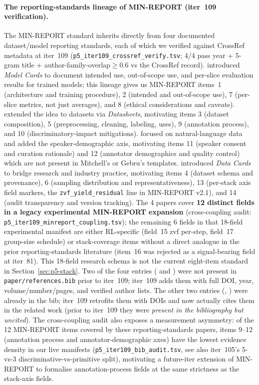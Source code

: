 \documentclass{article}  \usepackage[preprint,nonatbib]{neurips_2026} \usepackage[numbers]{natbib}
\providecommand{\secref}[1]{Section~\ref{#1}}
\begin{document}
\paragraph{The reporting-standards lineage of MIN-REPORT (iter~109
verification).} The MIN-REPORT standard inherits directly from four
documented dataset/model reporting standards, each of which we verified
against CrossRef metadata at iter~109 (\texttt{p5\_iter109\_crossref\_verify.tsv};
4/4 pass year + 5-gram title + author-family-overlap$\geq 0.6$ vs the
CrossRef record). \citet{mitchell2019modelcards} introduced \emph{Model
Cards} to document intended use, out-of-scope use, and per-slice evaluation
results for trained models; this lineage gives us MIN-REPORT items~1
(architecture and training procedure), 2 (intended and out-of-scope use),
7 (per-slice metrics, not just averages), and 8 (ethical considerations and
caveats). \citet{gebru2021datasheets} extended the idea to datasets via
\emph{Datasheets}, motivating items 3 (dataset composition), 5
(preprocessing, cleaning, labeling, uses), 9 (annotation process), and 10
(discriminatory-impact mitigations). \citet{bender2018datastatements}
focused on natural-language data and added the speaker-demographic axis,
motivating items 11 (speaker consent and curation rationale) and 12
(annotator demographics and quality control) which are not present in
Mitchell's or Gebru's templates. \citet{pushkarna2022datacards} introduced
\emph{Data Cards} to bridge research and industry practice, motivating
items 4 (dataset schema and provenance), 6 (sampling distribution and
representativeness), 13 (per-stack axis field markers, the
\texttt{zvf\_yield\_residual} line in MIN-REPORT v2.1), and 14 (audit
transparency and version tracking). The 4 papers cover
\textbf{12 distinct fields in a legacy experimental MIN-REPORT expansion} (cross-coupling audit:
\texttt{p5\_iter109\_minreport\_coupling.tsv}); the remaining 6 fields in
that 18-field experimental manifest are either RL-specific (field~15 zvf per-step, field~17
group-size schedule) or stack-coverage items without a direct analogue in
the prior reporting-standards literature (item~16 was rejected as a
signal-bearing field at iter~81). This 18-field research schema is not the
current eight-item standard in \secref{sec:p5-stack}. Two of the four entries
(\citet{bender2018datastatements} and \citet{pushkarna2022datacards}) were
not present in \texttt{paper/references.bib} prior to iter~109; iter~109
adds them with full DOI, year, volume/number/pages, and verified author
lists. The other two entries
(\citet{mitchell2019modelcards}, \citet{gebru2021datasheets}) were
already in the bib; iter~109 retrofits them with DOIs and now actually
cites them in the related work (prior to iter~109 they were \emph{present
in the bibliography but uncited}). The cross-coupling audit also exposes
a measurement asymmetry: of the 12 MIN-REPORT items covered by these
reporting-standards papers, items 9--12 (annotation process and
annotator-demographic axes) have the lowest evidence density in our
live manifests (\texttt{p5\_iter109\_bib\_audit.tsv}, see also
iter~105's 5-vs-3 discriminative-vs-primitive split), motivating a
future-iter extension of MIN-REPORT to formalise annotation-process
fields at the same strictness as the stack-axis fields.
\end{document}
